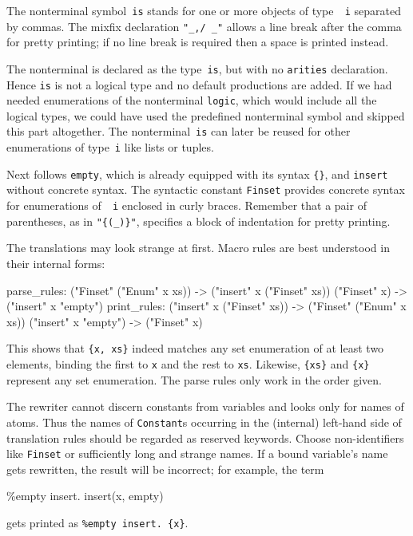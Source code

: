 The nonterminal symbol~{\tt is} stands for one or more objects of type~{\tt
  i} separated by commas.  The mixfix declaration \hbox{\verb|"_,/ _"|}
allows a line break after the comma for pretty printing; if no line break
is required then a space is printed instead.

The nonterminal is declared as the type~{\tt is}, but with no {\tt arities}
declaration.  Hence {\tt is} is not a logical type and no default
productions are added.  If we had needed enumerations of the nonterminal
{\tt logic}, which would include all the logical types, we could have used
the predefined nonterminal symbol  and skipped this part
altogether.  The nonterminal~{\tt is} can later be reused for other
enumerations of type~{\tt i} like lists or tuples.

Next follows {\tt empty}, which is already equipped with its syntax
\verb|{}|, and {\tt insert} without concrete syntax.  The syntactic
constant {\tt\at Finset} provides concrete syntax for enumerations of~{\tt
  i} enclosed in curly braces.  Remember that a pair of parentheses, as in
\verb|"{(_)}"|, specifies a block of indentation for pretty printing.

The translations may look strange at first.  Macro rules are best
understood in their internal forms:
\begin{ttbox}
parse_rules:
  ("{\at}Finset" ("{\at}Enum" x xs))  ->  ("insert" x ("{\at}Finset" xs))
  ("{\at}Finset" x)  ->  ("insert" x "empty")
print_rules:
  ("insert" x ("{\at}Finset" xs))  ->  ("{\at}Finset" ("{\at}Enum" x xs))
  ("insert" x "empty")  ->  ("{\at}Finset" x)
\end{ttbox}
This shows that \verb|{x, xs}| indeed matches any set enumeration of at least
two elements, binding the first to {\tt x} and the rest to {\tt xs}.
Likewise, \verb|{xs}| and \verb|{x}| represent any set enumeration.  
The parse rules only work in the order given.

\begin{warn}
  The \AST{} rewriter cannot discern constants from variables and looks
  only for names of atoms.  Thus the names of {\tt Constant}s occurring in
  the (internal) left-hand side of translation rules should be regarded as
  reserved keywords.  Choose non-identifiers like {\tt\at Finset} or
  sufficiently long and strange names.  If a bound variable's name gets
  rewritten, the result will be incorrect; for example, the term
\begin{ttbox}
\%empty insert. insert(x, empty)
\end{ttbox}
  gets printed as \verb|%empty insert. {x}|.
\end{warn}


